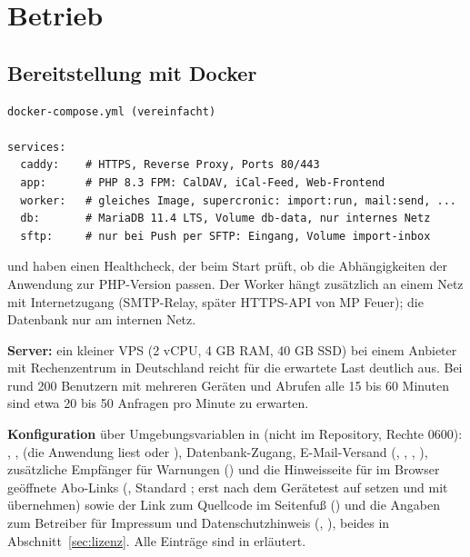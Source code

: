 \section{Betrieb}

\subsection{Bereitstellung mit Docker}

\begin{lstlisting}
docker-compose.yml (vereinfacht)

services:
  caddy:    # HTTPS, Reverse Proxy, Ports 80/443
  app:      # PHP 8.3 FPM: CalDAV, iCal-Feed, Web-Frontend
  worker:   # gleiches Image, supercronic: import:run, mail:send, ...
  db:       # MariaDB 11.4 LTS, Volume db-data, nur internes Netz
  sftp:     # nur bei Push per SFTP: Eingang, Volume import-inbox
\end{lstlisting}

 und  haben einen Healthcheck, der beim Start prüft,
ob die Abhängigkeiten der Anwendung zur PHP-Version passen. Der Worker hängt
zusätzlich an einem Netz mit Internetzugang (SMTP-Relay, später HTTPS-API von
MP Feuer); die Datenbank nur am internen Netz.

\textbf{Server:} ein kleiner VPS (2 vCPU, 4 GB RAM, 40 GB SSD) bei einem
Anbieter mit Rechenzentrum in Deutschland reicht für die erwartete Last
deutlich aus. Bei rund 200 Benutzern mit mehreren Geräten und Abrufen alle
15 bis 60 Minuten sind etwa 20 bis 50 Anfragen pro Minute zu erwarten.

\textbf{Konfiguration} über Umgebungsvariablen in
 (nicht im Repository, Rechte 0600):
, ,  (die Anwendung liest
 oder ), Datenbank-Zugang, E-Mail-Versand
(, , ,
), zusätzliche Empfänger für Warnungen
() und die Hinweisseite für im Browser geöffnete
Abo-Links (, Standard ; erst nach dem
Gerätetest auf  setzen und mit  übernehmen) sowie
der Link zum Quellcode im Seitenfuß () und die Angaben
zum Betreiber für Impressum und Datenschutzhinweis (,
), beides in Abschnitt~\ref{sec:lizenz}. Alle Einträge sind in  erläutert.

